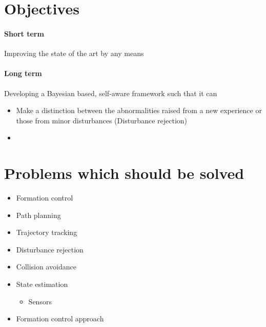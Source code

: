 \documentclass{article}
\begin{document}
	\section{Objectives}
		\paragraph{Short term}
			Improving the state of the art by any means
		\paragraph{Long term}
			Developing a Bayesian based, self-aware framework such that it  can
				\begin{itemize}
					\item Make a distinction between the abnormalities raised from a new experience or those from minor disturbances (Disturbance rejection)
					\item 
				\end{itemize}
	\section{Problems which should be solved}
		\begin{itemize}
			\item Formation control
			\item Path planning
			\item Trajectory tracking
			\item Disturbance rejection
			\item Collision avoidance
			\item State estimation
				\begin{itemize}
					\item Sensors
				\end{itemize}
			\item Formation control approach
		\end{itemize}
\end{document}
